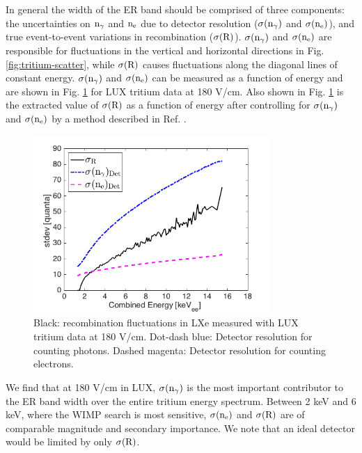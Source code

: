 In general the width of the ER band should be comprised of three components: the uncertainties on  $\rm n_{\gamma}$ and $\rm n_e$  due to detector resolution ($\rm \sigma(n_{\gamma})$ and $\rm \sigma(n_e)$), and true event-to-event variations in recombination ($\rm \sigma(R)$). $\rm \sigma(n_{\gamma})$ and $\rm \sigma(n_e)$ are responsible for fluctuations in the vertical  and horizontal directions in Fig. \ref{fig:tritium-scatter},  while 
$\rm \sigma(R)$ causes fluctuations along the diagonal lines of constant energy. $\rm \sigma(n_{\gamma})$ and $\rm \sigma(n_e)$ can be measured as a function of energy and are shown in Fig. \ref{fig:recomb-flucs} for LUX tritium data at 180 V/cm\cite{Dobi_Thesis}. Also shown in Fig. \ref{fig:recomb-flucs} is the extracted value of $\rm \sigma(R)$ as a function of energy after controlling for $\rm \sigma(n_{\gamma})$ and $\rm \sigma(n_e)$ by a method described in Ref. \cite{Dobi_Thesis}. 

\begin{figure}[h!]\centering
\includegraphics[width=90mm]{fig/recomb_flucs.png}
\caption{Black: recombination fluctuations in LXe measured with LUX tritium data at 180 V/cm. Dot-dash blue: Detector resolution for counting photons. Dashed magenta: Detector resolution for counting electrons.}
\label{fig:recomb-flucs}
\end{figure}

We find that at 180 V/cm in LUX, $\rm \sigma(n_{\gamma})$ is the most important contributor to the ER band width over the entire tritium energy spectrum. Between 2 keV and 6 keV, where the WIMP search is most sensitive, $\rm \sigma(n_e)$ and $\rm \sigma(R)$ are of comparable magnitude and secondary importance. We note that an ideal detector would be limited by only $\rm \sigma(R)$.





